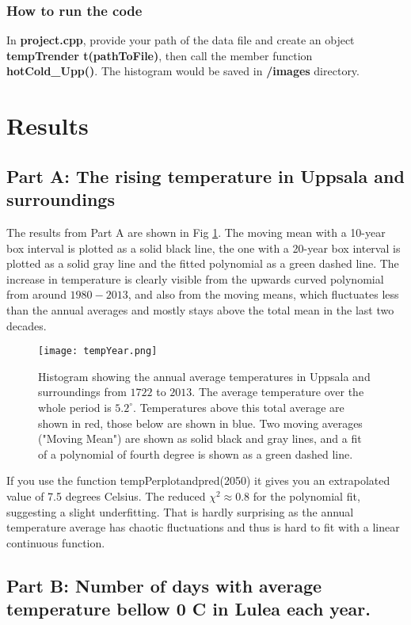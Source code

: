 \documentclass[a4paper]{article}
\begin{document}
\subsubsection{How to run the code}
In \textbf{project.cpp}, provide your path of the data file and create an object\textbf{ tempTrender t(pathToFile)}, then call the member function \textbf{hotCold\_Upp()}. The histogram would be saved in \textbf{/images} directory.



\section{Results}\label{sec:results}
\subsection{Part A: The rising temperature in Uppsala and surroundings}
The results from Part A are shown in Fig \ref{fig:year}. The moving mean with a 10-year box interval is plotted as a solid black line, the one with a 20-year box interval is plotted as a solid gray line and the fitted polynomial as a green dashed line. The increase in temperature is clearly visible from the upwards curved polynomial from around $1980-2013$, and also from the moving means, which fluctuates less than the annual averages and mostly stays above the total mean in the last two decades.
\begin{figure}[H]
   \centering
  \texttt{[image: tempYear.png]}
    \caption{Histogram showing the annual average temperatures in Uppsala and surroundings from $1722$ to $2013$. The average temperature over the whole period is $5.2^\circ$. Temperatures above this total average are shown in red, those below are shown in blue. Two moving averages ("Moving Mean") are shown as solid black and gray lines, and a fit of a polynomial of fourth degree is shown as a green dashed line.}
   \label{fig:year}
\end{figure}
If you use the function tempPerplotandpred(2050) it gives you an extrapolated value of 7.5 degrees Celsius.
The reduced $\chi^2 \approx 0.8$ for the polynomial fit, suggesting a slight underfitting. That is hardly surprising as the annual temperature average has chaotic fluctuations and thus is hard to fit with a linear continuous function.

\subsection{Part B: Number of days with average temperature bellow 0 C \degree in Lulea each
year.}
\end{document}
